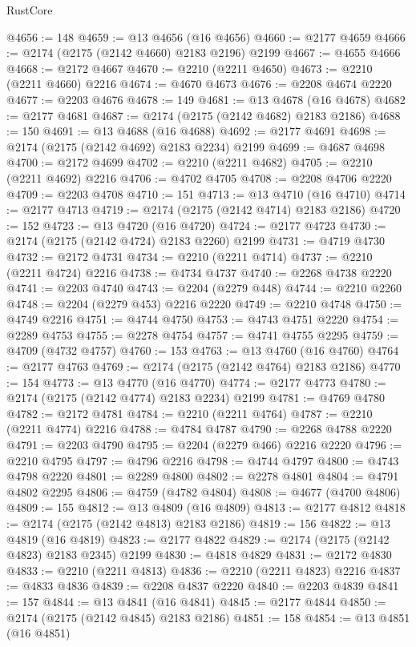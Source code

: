 \begin{lexlean}{RustCore}
\begin{coremodule}
@4656 := 148
@4659 := @13 @4656 (@16 @4656)
@4660 := @2177 @4659
@4666 := @2174 (@2175 (@2142 @4660) @2183 @2196) @2199
@4667 := @4655 @4666
@4668 := @2172 @4667
@4670 := @2210 (@2211 @4650)
@4673 := @2210 (@2211 @4660) @2216
@4674 := @4670 @4673
@4676 := @2208 @4674 @2220
@4677 := @2203 @4676
@4678 := 149
@4681 := @13 @4678 (@16 @4678)
@4682 := @2177 @4681
@4687 := @2174 (@2175 (@2142 @4682) @2183 @2186)
@4688 := 150
@4691 := @13 @4688 (@16 @4688)
@4692 := @2177 @4691
@4698 := @2174 (@2175 (@2142 @4692) @2183 @2234) @2199
@4699 := @4687 @4698
@4700 := @2172 @4699
@4702 := @2210 (@2211 @4682)
@4705 := @2210 (@2211 @4692) @2216
@4706 := @4702 @4705
@4708 := @2208 @4706 @2220
@4709 := @2203 @4708
@4710 := 151
@4713 := @13 @4710 (@16 @4710)
@4714 := @2177 @4713
@4719 := @2174 (@2175 (@2142 @4714) @2183 @2186)
@4720 := 152
@4723 := @13 @4720 (@16 @4720)
@4724 := @2177 @4723
@4730 := @2174 (@2175 (@2142 @4724) @2183 @2260) @2199
@4731 := @4719 @4730
@4732 := @2172 @4731
@4734 := @2210 (@2211 @4714)
@4737 := @2210 (@2211 @4724) @2216
@4738 := @4734 @4737
@4740 := @2268 @4738 @2220
@4741 := @2203 @4740
@4743 := @2204 (@2279 @448)
@4744 := @2210 @2260
@4748 := @2204 (@2279 @453) @2216 @2220
@4749 := @2210 @4748
@4750 := @4749 @2216
@4751 := @4744 @4750
@4753 := @4743 @4751 @2220
@4754 := @2289 @4753
@4755 := @2278 @4754
@4757 := @4741 @4755 @2295
@4759 := @4709 (@4732 @4757)
@4760 := 153
@4763 := @13 @4760 (@16 @4760)
@4764 := @2177 @4763
@4769 := @2174 (@2175 (@2142 @4764) @2183 @2186)
@4770 := 154
@4773 := @13 @4770 (@16 @4770)
@4774 := @2177 @4773
@4780 := @2174 (@2175 (@2142 @4774) @2183 @2234) @2199
@4781 := @4769 @4780
@4782 := @2172 @4781
@4784 := @2210 (@2211 @4764)
@4787 := @2210 (@2211 @4774) @2216
@4788 := @4784 @4787
@4790 := @2268 @4788 @2220
@4791 := @2203 @4790
@4795 := @2204 (@2279 @466) @2216 @2220
@4796 := @2210 @4795
@4797 := @4796 @2216
@4798 := @4744 @4797
@4800 := @4743 @4798 @2220
@4801 := @2289 @4800
@4802 := @2278 @4801
@4804 := @4791 @4802 @2295
@4806 := @4759 (@4782 @4804)
@4808 := @4677 (@4700 @4806)
@4809 := 155
@4812 := @13 @4809 (@16 @4809)
@4813 := @2177 @4812
@4818 := @2174 (@2175 (@2142 @4813) @2183 @2186)
@4819 := 156
@4822 := @13 @4819 (@16 @4819)
@4823 := @2177 @4822
@4829 := @2174 (@2175 (@2142 @4823) @2183 @2345) @2199
@4830 := @4818 @4829
@4831 := @2172 @4830
@4833 := @2210 (@2211 @4813)
@4836 := @2210 (@2211 @4823) @2216
@4837 := @4833 @4836
@4839 := @2208 @4837 @2220
@4840 := @2203 @4839
@4841 := 157
@4844 := @13 @4841 (@16 @4841)
@4845 := @2177 @4844
@4850 := @2174 (@2175 (@2142 @4845) @2183 @2186)
@4851 := 158
@4854 := @13 @4851 (@16 @4851)

\end{coremodule}
\end{lexlean}

